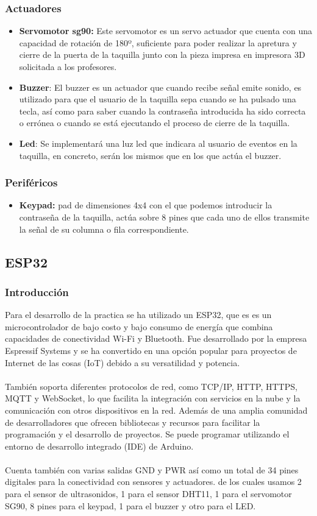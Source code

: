 \documentclass[12pt]{report}
\begin{document}
\subsubsection{Actuadores}
\begin{itemize}
    \item \textbf{Servomotor sg90: }Este servomotor es un servo actuador que cuenta con una capacidad de rotación de 180º, suficiente para poder realizar la apretura y cierre de la puerta de la taquilla junto con la pieza impresa en impresora 3D solicitada a los profesores.
    \item \textbf{Buzzer}: El buzzer es un actuador que cuando recibe señal emite sonido, es utilizado para que el usuario de la taquilla sepa cuando se ha pulsado una tecla, así como para saber cuando la contraseña introducida ha sido correcta o errónea o cuando se está ejecutando el proceso de cierre de la taquilla.
    \item \textbf{Led}: Se implementará una luz led que indicara al usuario de eventos en la taquilla, en concreto, serán los mismos que en los que actúa el buzzer.
\end{itemize}
\subsubsection{Periféricos}
\begin{itemize}
    \item \textbf{Keypad:} pad de dimensiones 4x4 con el que podemos introducir la contraseña de la taquilla, actúa sobre 8 pines que cada uno de ellos transmite la señal de su columna o fila correspondiente.
\end{itemize}
\subsection{ESP32}
\subsubsection{Introducción}
Para el desarrollo de la practica se ha utilizado un ESP32, que es es un microcontrolador de bajo costo y bajo consumo de energía que combina capacidades de conectividad Wi-Fi y Bluetooth. Fue desarrollado por la empresa Espressif Systems y se ha convertido en una opción popular para proyectos de Internet de las cosas (IoT) debido a su versatilidad y potencia. 
\\\\
También soporta diferentes protocolos de red, como TCP/IP, HTTP, HTTPS, MQTT y WebSocket, lo que facilita la integración con servicios en la nube y la comunicación con otros dispositivos en la red. Además de una amplia comunidad de desarrolladores que ofrecen bibliotecas y recursos para facilitar la programación y el desarrollo de proyectos. Se puede programar utilizando el entorno de desarrollo integrado (IDE) de Arduino. 
\\\\
Cuenta también con varias salidas GND y PWR así como un total de 34 pines digitales para la conectividad con sensores y actuadores. de los cuales usamos 2 para el sensor de ultrasonidos, 1 para el sensor DHT11, 1 para el servomotor SG90, 8 pines para el keypad, 1 para el buzzer y otro para el LED.
\end{document}
